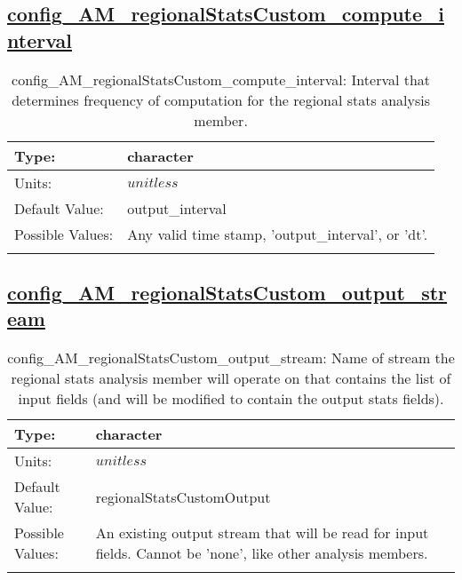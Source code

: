 \subsection[config\_AM\_regionalStatsCustom\_compute\_interval]{\hyperref[sec:nm_tab_AM_regionalStatsCustom]{config\_AM\_regionalStatsCustom\_compute\_interval}}
\label{subsec:nm_sec_config_AM_regionalStatsCustom_compute_interval}
\begin{center}
\begin{longtable}{| p{2.0in} || p{4.0in} |}
    \hline
    Type: & character \\
    \hline
    Units: & $unitless$ \\
    \hline
    Default Value: & output\_interval \\
    \hline
    Possible Values: & Any valid time stamp, 'output\_interval', or 'dt'. \\
    \hline
    \caption{config\_AM\_regionalStatsCustom\_compute\_interval: Interval that determines frequency of computation for the regional stats analysis member.}
\end{longtable}
\end{center}
\subsection[config\_AM\_regionalStatsCustom\_output\_stream]{\hyperref[sec:nm_tab_AM_regionalStatsCustom]{config\_AM\_regionalStatsCustom\_output\_stream}}
\label{subsec:nm_sec_config_AM_regionalStatsCustom_output_stream}
\begin{center}
\begin{longtable}{| p{2.0in} || p{4.0in} |}
    \hline
    Type: & character \\
    \hline
    Units: & $unitless$ \\
    \hline
    Default Value: & regionalStatsCustomOutput \\
    \hline
    Possible Values: & An existing output stream that will be read for input fields. Cannot be 'none', like other analysis members. \\
    \hline
    \caption{config\_AM\_regionalStatsCustom\_output\_stream: Name of stream the regional stats analysis member will operate on that contains the list of input fields (and will be modified to contain the output stats fields).}
\end{longtable}
\end{center}
